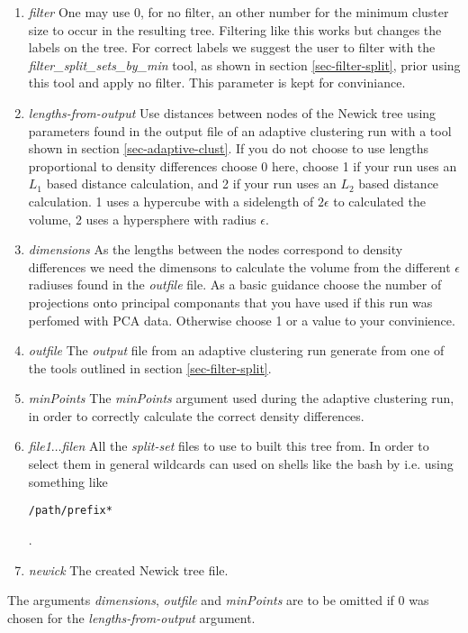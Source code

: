 \begin{enumerate}
  \item \emph{filter} One may use 0, for no filter, an other number for the
    minimum cluster size to occur in the resulting tree. Filtering
    like this works but changes the labels on the tree. For correct
    labels we suggest the user to filter with the
    \emph{filter\_split\_sets\_by\_min} tool, as shown in section
    \ref{sec-filter-split}, prior using this tool and
    apply no filter. This parameter is kept for conviniance.
  \item \emph{lengths-from-output} Use distances between nodes of the
    Newick tree using parameters found in the output file of an
    adaptive clustering run with a tool shown in section
    \ref{sec-adaptive-clust}. If you do not choose to use lengths
    proportional to density differences choose 0 here, choose 1 if
    your run uses an $L_1$ based distance calculation, and 2 if your
    run uses an $L_2$ based distance calculation. 1 uses a hypercube
    with a sidelength of $2\epsilon$ to calculated the volume, 2 uses
    a hypersphere with radius $\epsilon$.
  \item \emph{dimensions} As the lengths between the nodes correspond
    to density differences we need the dimensons to calculate the
    volume from the different $\epsilon$ radiuses found in the
    \emph{outfile} file. As a basic guidance choose the number of
    projections onto principal componants that you have used if this
    run was perfomed with PCA data. Otherwise choose 1 or a value to
    your convinience.
  \item \emph{outfile} The \emph{output} file from an adaptive
    clustering run generate from one of the tools outlined in section
    \ref{sec-filter-split}.
  \item \emph{minPoints} The \emph{minPoints} argument used during the
    adaptive clustering run, in order to correctly calculate the
    correct density differences.
  \item \emph{file1$\ldots$filen} All the \emph{split-set} files
    to use to built this tree from. In order to select them in general
    wildcards can used on shells like the bash by i.e. using something
    like \begin{verbatim}/path/prefix*\end{verbatim}.
  \item \emph{newick} The created Newick tree file. 
\end{enumerate}
The arguments \emph{dimensions}, \emph{outfile} and \emph{minPoints}
are to be omitted if 0 was chosen for the \emph{lengths-from-output}
argument.


